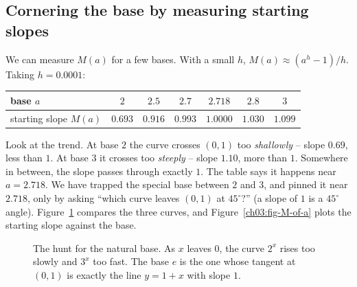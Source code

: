 \subsection{Cornering the base by measuring starting slopes}

We can measure $M(a)$ for a few bases. With a small $h$, $M(a)\approx (a^h-1)/h$. Taking $h=0.0001$:

\begin{center}
\begin{tabular}{@{}lcccccc@{}}
\toprule
base $a$ & $2$ & $2.5$ & $2.7$ & $2.718$ & $2.8$ & $3$ \\
\midrule
starting slope $M(a)$ & $0.693$ & $0.916$ & $0.993$ & $1.0000$ & $1.030$ & $1.099$ \\
\bottomrule
\end{tabular}
\end{center}

Look at the trend. At base $2$ the curve crosses $(0,1)$ too \emph{shallowly} -- slope $0.69$, less than $1$. At base $3$ it crosses too \emph{steeply} -- slope $1.10$, more than $1$. Somewhere in between, the slope passes through exactly $1$. The table says it happens near $a=2.718$. We have trapped the special base between $2$ and $3$, and pinned it near $2.718$, only by asking ``which curve leaves $(0,1)$ at $45^\circ$?'' (a slope of $1$ is a $45^\circ$ angle). Figure~\ref{ch03:fig-slope-one} compares the three curves, and Figure~\ref{ch03:fig-M-of-a} plots the starting slope against the base.

\begin{figure}[htbp]
\centering
{}
\caption{The hunt for the natural base. As $x$ leaves $0$, the curve $2^x$ rises too slowly and $3^x$ too fast. The base $e$ is the one whose tangent at $(0,1)$ is exactly the line $y=1+x$ with slope $1$.}
\label{ch03:fig-slope-one}
\end{figure}

